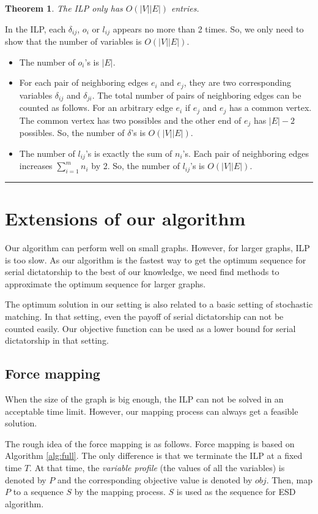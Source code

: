 \documentclass[letterpaper]{article}
\newtheorem{theorem}{Theorem}%
\newenvironment{proof}{{Proof:}}{\hfill\rule{2mm}{2mm}}
\begin{document}
\begin{theorem}
	The ILP only has $O(|V||E|)$ entries.
\end{theorem}
\begin{proof}
	In the ILP, each $\delta_{ij}$, $o_i$ or $l_{ij}$  appears no more than 2 times.
	So, we only need to show that the number of variables is $O(|V||E|)$.
	\begin{itemize}
		\item The number of $o_i$'s is $|E|$.
		\item For each pair of neighboring edges $e_i$ and $e_j$, they are two corresponding variables $\delta_{ij}$ and $\delta_{ji}$. The total number of pairs of neighboring edges can be counted as follows. For an arbitrary edge $e_i$ if $e_j$ and $e_j$ has a common vertex. The common vertex has two possibles and the other end of $e_j$ has $|E|-2$ possibles. So, the number of $\delta$'s is $O(|V||E|)$.
		\item The number of $l_{ij}$'s is exactly the sum of $n_i$'s. Each pair of neighboring edges increases $\sum_{i=1}^m n_i$ by 2. So, the number of $l_{ij}$'s is $O(|V||E|)$.
	\end{itemize}
\end{proof}

\section{Extensions of our algorithm}
Our algorithm can perform well on small graphs.
However, for larger graphs, ILP is too slow.
As our algorithm is the fastest way to get the optimum sequence for serial dictatorship to the best of our knowledge, we need find methods to approximate the optimum sequence for larger graphs.

The optimum solution in our setting is also related to a basic setting of stochastic matching. In that setting, even the payoff of serial dictatorship can not be counted easily. Our objective function can be used as a lower bound for serial dictatorship in that setting. 

\subsection{Force mapping}
When the size of the graph is big enough, the ILP can not be solved in an acceptable time limit.
However, our mapping process can always get a feasible solution.

The rough idea of the force mapping is as follows.
Force mapping is based on Algorithm \ref{alg:full}.
The only difference is that we terminate the ILP at a fixed time $T$.
At that time, the \textit{variable profile} (the values of all the variables) is denoted by $P$ and the corresponding objective value is denoted by $obj$.
Then, map $P$ to a sequence $S$ by the mapping process.
$S$ is used as the sequence for ESD algorithm.
\end{document}
